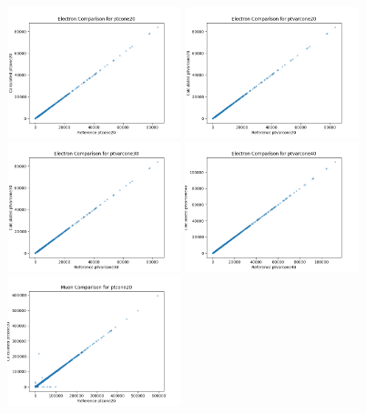 \begin{figure}[htbp]
    \centering
    \includegraphics[width=0.45\textwidth]{Images/RNN/electron_ptcone20.png}
    \includegraphics[width=0.45\textwidth]{Images/RNN/electron_ptvarcone20.png}
    \includegraphics[width=0.45\textwidth]{Images/RNN/electron_ptvarcone30.png}
    \includegraphics[width=0.45\textwidth]{Images/RNN/electron_ptvarcone40.png}
    \includegraphics[width=0.45\textwidth]{Images/RNN/muon_ptcone20.png}

\end{figure}
